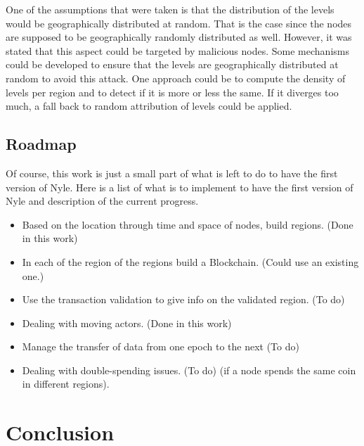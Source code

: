 \documentclass[a4paper,11pt,twoside=semi,openright]{report}
\begin{document}
One of the assumptions that were taken is that the distribution of the levels
would be geographically distributed at random. That is the case since the
nodes are supposed to be geographically randomly distributed as well.
However, it was stated that this aspect could be targeted by malicious nodes.
 Some mechanisms could be developed to ensure
that the levels are geographically distributed at random to avoid this attack. One approach could be
to compute the density of levels per region and to detect if it is more or less
the same. If it diverges too much, a fall back to random attribution of levels
could be applied. 

\section{Roadmap}
Of course, this work is just a small part of what is left to do to have the first
version of Nyle. Here is a list of what is to implement to have the first version
of Nyle and description of the current progress.

\begin{itemize} 
\item Based on the location through time and space of nodes, build regions.
(Done in this work)
\item In each of the region of the regions build a Blockchain. (Could use an
 existing one.)
\item Use the transaction validation to give info on the validated region. (To
do) 
\item Dealing with moving actors. (Done in this work)
\item Manage the transfer of data from one epoch to the next (To do)
\item Dealing with double-spending issues. (To do)
(if a node spends the same coin in different regions). 
\end{itemize}

\chapter{Conclusion} \label{chap:Conclusion} %

\end{document}
